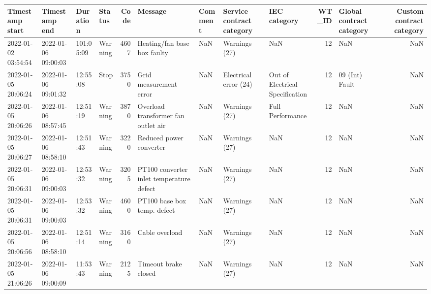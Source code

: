 \begin{tabular}{llllrllllrlr}
\toprule
Timestamp start & Timestamp end & Duration & Status & Code & Message & Comment & Service contract category & IEC category & WT\_ID & Global contract category & Custom contract category \\
\midrule
2022-01-02 03:54:54 & 2022-01-06 09:00:03 & 101:05:09 & Warning & 4607 & Heating/fan base box faulty & NaN & Warnings (27) & NaN & 12 & NaN & NaN \\
2022-01-05 20:06:24 & 2022-01-06 09:01:32 & 12:55:08 & Stop & 3750 & Grid measurement error & NaN & Electrical error (24) & Out of Electrical Specification & 12 & 09 (Int) Fault & NaN \\
2022-01-05 20:06:26 & 2022-01-06 08:57:45 & 12:51:19 & Warning & 3870 & Overload transformer fan outlet air & NaN & Warnings (27) & Full Performance & 12 & NaN & NaN \\
2022-01-05 20:06:27 & 2022-01-06 08:58:10 & 12:51:43 & Warning & 3220 & Reduced power converter & NaN & Warnings (27) & NaN & 12 & NaN & NaN \\
2022-01-05 20:06:31 & 2022-01-06 09:00:03 & 12:53:32 & Warning & 3205 & PT100 converter inlet temperature defect & NaN & Warnings (27) & NaN & 12 & NaN & NaN \\
2022-01-05 20:06:31 & 2022-01-06 09:00:03 & 12:53:32 & Warning & 4600 & PT100 base box temp. defect & NaN & Warnings (27) & NaN & 12 & NaN & NaN \\
2022-01-05 20:06:56 & 2022-01-06 08:58:10 & 12:51:14 & Warning & 3160 & Cable overload & NaN & Warnings (27) & NaN & 12 & NaN & NaN \\
2022-01-05 21:06:26 & 2022-01-06 09:00:09 & 11:53:43 & Warning & 2125 & Timeout brake closed & NaN & Warnings (27) & NaN & 12 & NaN & NaN \\
\bottomrule
\end{tabular}
